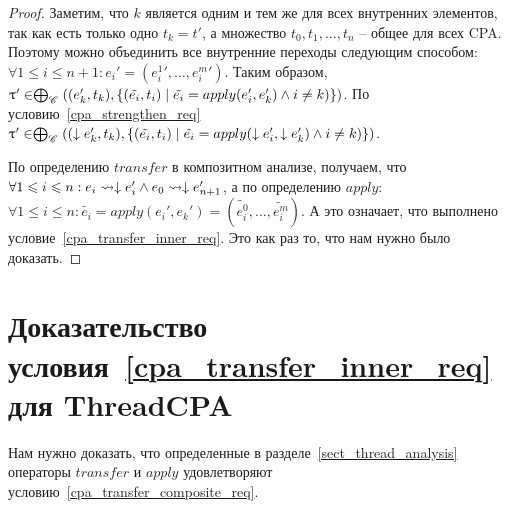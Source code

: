 \begin{proof}
Заметим, что $k$ является одним и тем же для всех внутренних элементов, так как есть только одно $t_k = t'$, а множество $t_0, t_1, \dots, t_n$ -- общее для всех CPA.
Поэтому можно объединить все внутренние переходы следующим способом:
$ \forall 1 \le i \le n+1: e_i' = ({e^1_i}', \dots, {e^m_i}')$.
Таким образом, $\uptau' \in \mathrel{\bigoplus}_{\mathscr{C}}((e_k', t_k), \{(\tilde{e_i}, t_i) \mid \tilde{e_i} = apply(e'_i, e'_k) \land i \neq k)\})$.
По условию~\ref{cpa_strengthen_req} $\uptau' \in \mathrel{\bigoplus}_{\mathscr{C}}((\downarrow e_k', t_k), \{(\tilde{e_i}, t_i) \mid \tilde{e_i} = apply(\downarrow  e'_i, \downarrow  e'_k) \land i \neq k)\})$.

По определению $transfer$ в композитном анализе, получаем, что $\forall 1 \leqslant i \leqslant n: e_i \leadsto \downarrow e_i' \land e_0 \leadsto \downarrow e'_{n+1}$, а по определению $apply$: $\forall 1 \le i \le n: \tilde{e_i} = apply(e_i', e_k') = (\tilde{e^0_i}, \dots, \tilde{e^m_i})$.
А это означает, что выполнено условие~\ref{cpa_transfer_inner_req}.
Это как раз то, что нам нужно было доказать. 
\end{proof}

\section{Доказательство условия~\ref{cpa_transfer_inner_req} для ThreadCPA}
\label{sect_transfer_thread_proof}

Нам нужно доказать, что определенные в разделе~\ref{sect_thread_analysis} операторы $transfer$ и $apply$ удовлетворяют условию~\ref{cpa_transfer_composite_req}.


